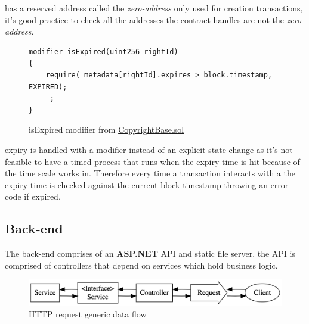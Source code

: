  has a reserved address called the \textit{zero-address} only used for  creation transactions, it's good practice to check all the addresses the contract handles are not the \textit{zero-address}. 

\begin{figure}[H]
\caption{isExpired modifier from \href{https://github.com/MrHarrisonBarker/CRPL/blob/main/CRPL.Contracts/contracts/Copyrights/CopyrightBase.sol}{CopyrightBase.sol}}
\centering
\begin{lstlisting}[language=Solidity]
modifier isExpired(uint256 rightId)
{
	require(_metadata[rightId].expires > block.timestamp, EXPIRED);
	_;
}
\end{lstlisting}
\end{figure}

 expiry is handled with a modifier instead of an explicit state change as it's not feasible to have a timed process that runs when the expiry time is hit because of the time scale  works in. Therefore every time a transaction interacts with a  the expiry time is checked against the current block timestamp throwing an error code if expired.

\subsection{Back-end}

The back-end comprises of an \textbf{ASP.NET} API and static file server, the API is comprised of controllers that depend on services which hold business logic.

\begin{figure}[H]
\caption{HTTP request generic data flow}
\centering
\includegraphics[width=\textwidth,height=\textheight,keepaspectratio]{images/patterns/service-controller}
\end{figure}

